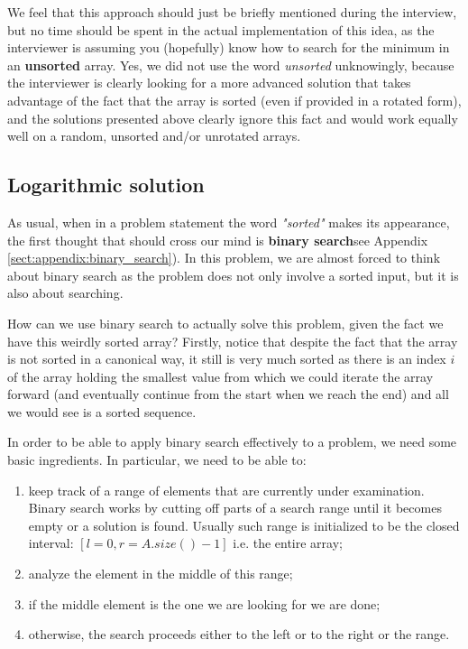 We feel that this approach should just be briefly mentioned during the interview, but no time should be spent in the actual implementation of this idea, as the interviewer is assuming you (hopefully) know how to search for the minimum in an \textbf{unsorted} array. Yes, we did not use the word \textit{unsorted} unknowingly, because the interviewer is clearly looking for a more advanced solution that takes advantage of the fact that the array is sorted (even if provided in a rotated form), and the solutions presented above clearly ignore this fact and would work equally well on a random, unsorted and/or unrotated arrays.

\subsection{Logarithmic solution}
\label{min_rotated_array:sec:log}
As usual, when in a problem statement the word \textit{"sorted"} makes its appearance, the first thought that should cross our mind is \textbf{binary search}see Appendix \ref{sect:appendix:binary_search}). In this problem, we are almost forced to think about binary search as the problem does not only involve a sorted input, but it is also about searching. 

How can we use binary search to actually solve this problem, given the fact we have this weirdly sorted array? 
Firstly, notice that despite the fact that the array is not sorted in a canonical way, it still is very much sorted as there is an index $i$ of the array holding the smallest value from which we could iterate the array forward (and eventually continue from the start when we reach the end) and all we would see is a sorted sequence.

In order to be able to apply binary search effectively to a problem, we need some basic ingredients. In particular, we need to be able to:
\begin{enumerate}
	\item keep track of a range of elements that are currently under examination. Binary search works by cutting off parts of a search range until it becomes empty or a solution is found.  Usually such range is initialized to be the closed interval: $[l=0, r=A.size()-1]$ i.e. the entire array;
	\item analyze the element in the middle of this range;
	\item if the middle element is the one we are looking for we are done;
	\item otherwise, the search proceeds either to the left or to the right or the range. 
\end{enumerate}

